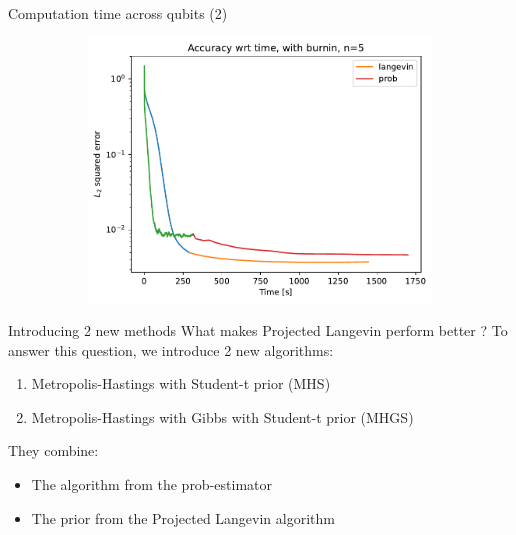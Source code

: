 \documentclass{beamer}
\begin{document}
\begin{frame}{Computation time across qubits (2)}
\begin{figure}[H]
\begin{subfigure}[b]{0.4\textwidth}
            
            \includegraphics[width=\linewidth]{figures/experiments/baseline/diff_n_qubits/iters_acc_comp_time_no_avg_n5-1.png}
        \end{subfigure}
            \quad
            \begin{minipage}[b]{.1\textwidth}
            \end{minipage}
            \hspace*{\fill}
        \label{fig:conv-plot-diff-n}
    
    \end{figure}
\end{frame}

\begin{frame}{Introducing 2 new methods}
    What makes Projected Langevin perform better ?\medbreak
    To answer this question, we introduce 2 new algorithms:
    \begin{enumerate} 
    \item Metropolis-Hastings with Student-t prior (MHS)
    \item Metropolis-Hastings with Gibbs with Student-t prior (MHGS)
    \end{enumerate}
    They combine:
    \begin{itemize}
        \item The algorithm from the prob-estimator
        \item The prior from the Projected Langevin algorithm
    \end{itemize}
\end{frame}
\end{document}
